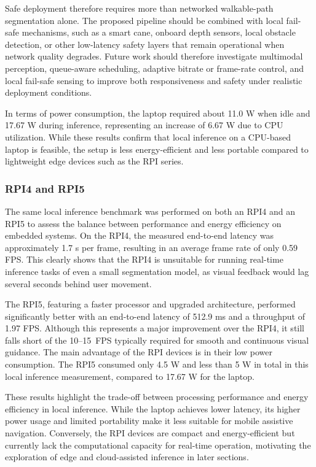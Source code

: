 \documentclass{ieeeaccess}
\begin{document}
Safe deployment therefore requires more than networked walkable-path segmentation alone. The proposed pipeline should be combined with local fail-safe mechanisms, such as a smart cane, onboard depth sensors, local obstacle detection, or other low-latency safety layers that remain operational when network quality degrades. Future work should therefore investigate multimodal perception, queue-aware scheduling, adaptive bitrate or frame-rate control, and local fail-safe sensing to improve both responsiveness and safety under realistic deployment conditions.

In terms of power consumption, the laptop required about 11.0 W when idle and 17.67 W during inference, representing an increase of 6.67 W due to CPU utilization.
While these results confirm that local inference on a CPU-based laptop is feasible, the setup is less energy-efficient and less portable compared to lightweight edge devices such as the RPI series.

\subsubsection{RPI4 and RPI5}

The same local inference benchmark was performed on both an RPI4 and an RPI5 to assess the balance between performance and energy efficiency on embedded systems.
On the RPI4, the measured end-to-end latency was approximately 1.7 s per frame, resulting in an average frame rate of only 0.59 FPS.
This clearly shows that the RPI4 is unsuitable for running real-time inference tasks of even a small segmentation model, as visual feedback would lag several seconds behind user movement.

The RPI5, featuring a faster processor and upgraded architecture, performed significantly better with an end-to-end latency of 512.9 ms and a throughput of 1.97 FPS.
Although this represents a major improvement over the RPI4, it still falls short of the 10--15~FPS typically required for smooth and continuous visual guidance.
The main advantage of the RPI devices is in their low power consumption. The RPI5 consumed only 4.5 W  and less than 5 W in total in this local inference measurement, compared to 17.67 W for the laptop.

These results highlight the trade-off between processing performance and energy efficiency in local inference.
While the laptop achieves lower latency, its higher power usage and limited portability make it less suitable for mobile assistive navigation.
Conversely, the RPI devices are compact and energy-efficient but currently lack the computational capacity for real-time operation, motivating the exploration of edge and cloud-assisted inference in later sections.
\end{document}

